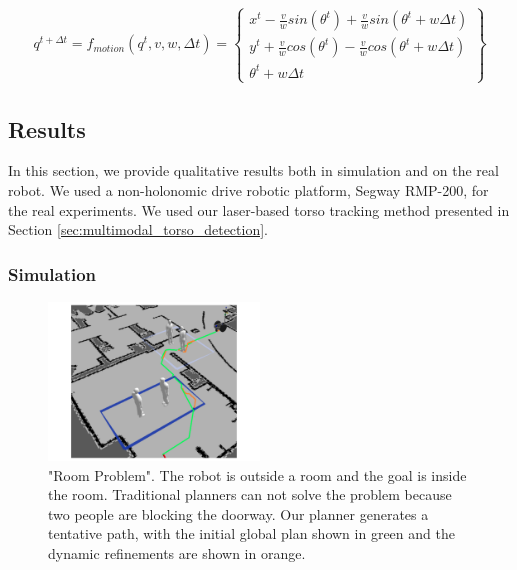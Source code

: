\begin{align}
q^{t+\Delta t} = 
f_{motion}(q^t,v,w,\Delta t) =
\begin{Bmatrix}
x^t-\frac{v}{w}sin(\theta^t)+\frac{v}{w}sin(\theta^t+w \Delta t)\\
y^t+\frac{v}{w}cos(\theta^t)-\frac{v}{w}cos(\theta^t+w \Delta t)\\
\theta^t + w\Delta t
\end{Bmatrix}
\label{eq:motion_model}
\end{align}



\subsection{Results}
\label{sec:navigation_results}

In this section, we provide qualitative results both in simulation and on the real robot. We used a non-holonomic drive robotic platform, Segway RMP-200, for the real experiments. We used our laser-based torso tracking method presented in Section \ref{sec:multimodal_torso_detection}.

\subsubsection{Simulation}
\label{sec:navigation_results_simulation}

\begin{figure}[h!]
\centering
\includegraphics[width=0.5\textwidth]{pics/room_sol_crop}
\caption{"Room Problem". The robot is outside a room and the goal is inside the room. Traditional planners can not solve the problem because two people are blocking the doorway. Our planner generates a tentative path, with the initial global plan shown in green and the dynamic refinements are shown in orange.}
\label{fig:room_sol}
\end{figure}

